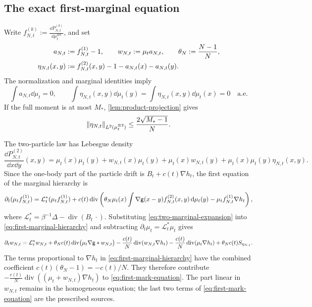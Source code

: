 \documentclass[11pt,reqno]{amsart}
\numberwithin{equation}{section}
\theoremstyle{plain}
\theoremstyle{remark}
\DeclarePairedDelimiter{\norm}{\lVert}{\rVert}
\DeclareMathOperator{\diver}{div}
\begin{document}
\subsection{The exact first-marginal equation}
Write $f_{N,t}^{(k)}:=\frac{\dd P_{N,t}^{(k)}}{\dd\mu_t^{\otimes k}}$, and set
\begin{align}
 a_{N,t}&:=f_{N,t}^{(1)}-1,\qquad
 w_{N,t}:=\mu_ta_{N,t},\qquad\theta_N:=\frac{N-1}{N},\notag\\
 \eta_{N,t}(x,y)&:=f_{N,t}^{(2)}(x,y)-1-a_{N,t}(x)-a_{N,t}(y).
 \label{eq:dynamic-projections}
\end{align}
The normalization and marginal identities imply
\begin{equation}\label{eq:dynamic-projection-centering}
 \int a_{N,t}\dd\mu_t=0,\qquad
 \int\eta_{N,t}(x,y)\dd\mu_t(y)=\int\eta_{N,t}(x,y)\dd\mu_t(x)=0
 \quad\text{a.e.}
\end{equation}
If the full moment is at most $M_*$, \cref{lem:product-projection} gives
\begin{equation}\label{eq:pair-projection}
 \norm{\eta_{N,t}}_{L^2(\mu_t^{\otimes2})}\le\frac{2\sqrt{M_*-1}}N.
\end{equation}

The two-particle law has Lebesgue density
\begin{equation}
 \label{eq:two-marginal-expansion} \frac{\dd P_{N,t}^{(2)}}{\dd x\dd y}(x,y) ={}\mu_t(x)\mu_t(y)+w_{N,t}(x)\mu_t(y)+\mu_t(x)w_{N,t}(y) +\mu_t(x)\mu_t(y)\eta_{N,t}(x,y).
\end{equation}
Since the one-body part of the particle drift is $B_t+c(t)\nabla h_t$, the first equation of the marginal hierarchy is
\begin{equation}
 \label{eq:first-marginal-hierarchy} \partial_t(\mu_t f_{N,t}^{(1)}) ={}\mathcal L_t^*(\mu_t f_{N,t}^{(1)}) +c(t)\diver\left(\theta_N\mu_t(x)\int\nabla\g(x-y)f_{N,t}^{(2)}(x,y)\dd\mu_t(y) -\mu_t f_{N,t}^{(1)}\nabla h_t\right),
\end{equation}
where $\mathcal L_t^*=\beta^{-1}\Delta-\diver(B_t\,\cdot)$. Substituting \eqref{eq:two-marginal-expansion} into \eqref{eq:first-marginal-hierarchy} and subtracting $\partial_t\mu_t=\mathcal L_t^*\mu_t$ gives
\begin{equation}
 \partial_tw_{N,t}={}\mathcal L_t^*w_{N,t} +\theta_Nc(t)\diver\bigl(\mu_t\nabla\g*w_{N,t}\bigr) -\frac{c(t)}N\diver(w_{N,t}\nabla h_t) -\frac{c(t)}N\diver(\mu_t\nabla h_t) +\theta_Nc(t)S_{\eta_{N,t}}. \label{eq:first-mark-equation}
\end{equation}
The terms proportional to $\nabla h_t$ in \eqref{eq:first-marginal-hierarchy} have the combined coefficient $c(t)(\theta_N-1)=-c(t)/N$. They therefore contribute $-\frac{c(t)}N\diver((\mu_t+w_{N,t})\nabla h_t)$ to \eqref{eq:first-mark-equation}. The part linear in $w_{N,t}$ remains in the homogeneous equation; the last two terms of \eqref{eq:first-mark-equation} are the prescribed sources.
\end{document}
